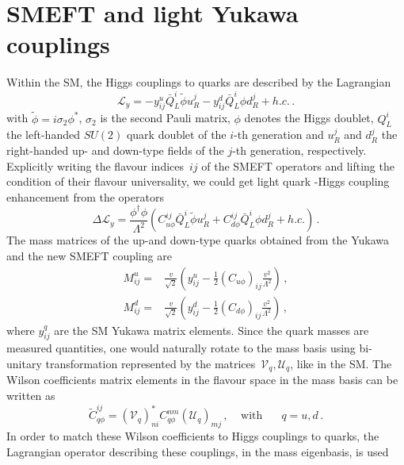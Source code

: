 \section{SMEFT and light Yukawa couplings\label{sec:EFTlightyuk}}
Within the SM, the Higgs couplings to quarks are described by the Lagrangian
\begin{equation}
	\mathcal{L}_{y}=-y^u_{ij} \bar{Q}_L^i \tilde{\phi} u_R^j - y^d_{ij} \bar{Q}_L^i \phi d_R^j +h.c.\,.
\end{equation}
with $\tilde{\phi}=i \sigma_2 \phi^*$, $\sigma_2$ is the second Pauli matrix, $\phi$ denotes the Higgs doublet, $Q_L^i$ the left-handed $SU(2)$ quark doublet of the $i$-th generation and $u_R^j$ and $d_R^j$ the right-handed up- and down-type fields of the $j$-th generation, respectively.\\
Explicitly writing the flavour indices~$ij$ of the SMEFT operators and lifting the condition of their flavour universality, we could get light quark -Higgs coupling enhancement from the operators
\begin{equation}
	\Delta \mathcal{L}_{y}=\frac{\phi^{\dagger}\phi}{\Lambda^2}\left( C_{u \phi}^{ij} \bar{Q}_L^i \tilde{\phi} u_R^j + C_{d \phi}^{ij} \bar{Q}_L^i \phi d_R^j +h.c.\right)\,.
	\label{eq:EFTop}
\end{equation}
  The mass matrices of the up-and down-type quarks obtained from the Yukawa and the new SMEFT coupling are
%
\begin{align}
	M^u_{ij} =& \frac{v}{\sqrt{2}} \left( y^u_{ij}-\frac{1}{2} (C_{u\phi})_{ij}\frac{v^2}{\Lambda^2}\right)\,,\nonumber\\
	M^d_{ij} =& \frac{v}{\sqrt{2}} \left( y^d_{ij}-\frac{1}{2} (C_{d\phi})_{ij}\frac{v^2}{\Lambda^2}\right)\,, \label{eq:mass}
\end{align}
where $y^q_{ij}$ are the SM Yukawa matrix elements. Since the quark masses are measured quantities, one would naturally rotate to the mass basis using bi-unitary transformation represented by the matrices~$ \mathcal{V}_q, \mathcal{U}_q$, like in the SM. The Wilson coefficients matrix elements in the flavour space in the mass basis can be written as
\begin{equation}
	\tilde{C}_{q \phi}^{ij}= \left(\mathcal{V}_{q}\right)^*_{ni}C^{nm}_{q\phi}\left( \mathcal U_{q}\right)_{mj}\, , \; \; \; \;  \text{with } \;\;\;\;\; q = u,d\, .
\end{equation}
In order to match these Wilson coefficients to Higgs couplings to quarks,  the Lagrangian operator describing these couplings, in the mass eigenbasis, is used
